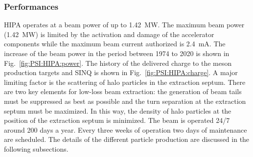 \begin{refsection}
        \subsubsection{Performances}
        HIPA operates at a beam power of up to \SI{1.42}{MW}. 
        The maximum beam power (\SI{1.42}{MW}) is limited by the activation and damage of the accelerator components while the maximum beam current authorized is \SI{2.4}{mA}.
        The increase of the beam power in the period between 1974 to 2020 is shown in Fig.~\ref{fig:PSI:HIPA:power}.
        The history of the delivered charge to the meson production targets and SINQ is shown in Fig.~\ref{fig:PSI:HIPA:charge}.  
        A major limiting factor is the scattering of halo particles in the extraction septum.
        There are two key elements for low-loss beam extraction: the generation of beam tails must
        be suppressed as best as possible and the turn separation at the extraction septum must be
        maximized. 
        In this way, the density of halo particles at the position of the extraction septum is minimized.
        The beam is operated 24/7 around 200 days a year. 
        Every three weeks of operation two days of maintenance are scheduled. 
        The details of the different particle production are discussed in the following subsections.


\end{refsection}

